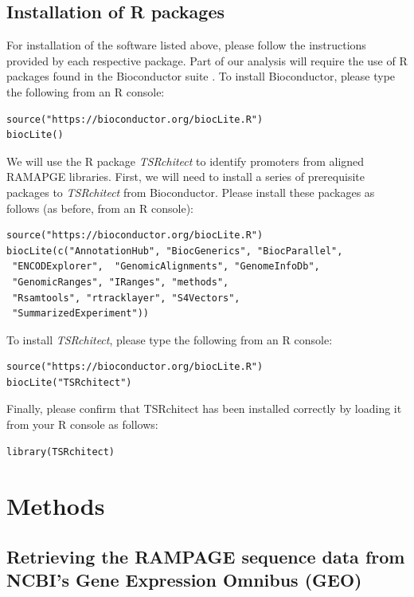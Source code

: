 \documentclass[runningheads,a4paper]{llncs}
\begin{document}
\begin{linenumbers}
\subsection{Installation of R packages}
For installation of the software listed above, please follow the instructions provided by each respective package. 
Part of our analysis will require the use of R packages found in the Bioconductor suite \cite{Lawrence:2014gy}.
To install Bioconductor, please type the following from an R console: 

\noindent
\begin{verbatim}
source("https://bioconductor.org/biocLite.R")
biocLite()
\end{verbatim}

We will use the R package \textit{TSRchitect} to identify promoters from aligned RAMAPGE libraries. 
First, we will need to install a series of prerequisite packages to \textit{TSRchitect} from Bioconductor.
Please install these packages as follows (as before, from an R console):

\noindent
\begin{verbatim}
source("https://bioconductor.org/biocLite.R")
biocLite(c("AnnotationHub", "BiocGenerics", "BiocParallel",
 "ENCODExplorer",  "GenomicAlignments", "GenomeInfoDb",
 "GenomicRanges", "IRanges", "methods", 
 "Rsamtools", "rtracklayer", "S4Vectors",
 "SummarizedExperiment"))
\end{verbatim}

To install \textit{TSRchitect}, please type the following from an R console:

\noindent
\begin{verbatim}
source("https://bioconductor.org/biocLite.R")
biocLite("TSRchitect")
\end{verbatim}

Finally, please confirm that TSRchitect has been installed correctly by loading it from your R console as follows:

\noindent
\begin{verbatim}
library(TSRchitect)
\end{verbatim}

\section{Methods}

\subsection{Retrieving the RAMPAGE sequence data from NCBI's Gene Expression Omnibus (GEO)}


\end{linenumbers}
\end{document}
